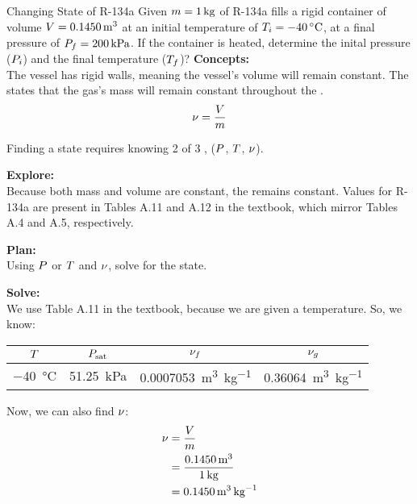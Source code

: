 \begin{example}[Problem 4.112]{Changing State of R-134a}
  Given $m = \SI{1}{\kilo\gram}$ of R-134a fills a rigid container of volume $V = \SI{0.1450}{\meter\cubed}$ at an initial temperature of $\Temp_{i} = \SI{-40}{\degreeCelsius}$, at a final pressure of $P_{f} = \SI{200}{\kilo\pascal}$.
  If the container is heated, determine the inital pressure ($P_{i}$) and the final temperature ($T_{f}$)?
  \tcblower{}
  \textbf{Concepts:} \\
  The vessel has rigid walls, meaning the vessel's volume will remain constant.
  The  states that the gas's mass will remain constant throughout the . \\
  \begin{equation*}
    \nu = \frac{V}{m}
  \end{equation*}

  Finding a state requires knowing 2 of 3 , ($P$, $T$, $\nu$).

  \textbf{Explore:} \\
  Because both mass and volume are constant, the  remains constant.
  Values for R-134a are present in Tables A.11 and A.12 in the textbook, which mirror Tables A.4 and A.5, respectively.

  \textbf{Plan:} \\
  Using $P$ or $T$ and $\nu$, solve for the state.

  \textbf{Solve:} \\
  We use Table A.11 in the textbook, because we are given a temperature.
  So, we know:
  \begin{center}
    \begin{tabular}{cccc}
      \toprule
      $T$ & $P_{\mathrm{sat}}$ & $\nu_{f}$ & $\nu_{g}$ \\
      \midrule
      \SI{-40}{\degreeCelsius} & \SI{51.25}{\kilo\pascal} & \SI{0.0007053}{\meter\cubed\per\kilo\gram} & \SI{0.36064}{\meter\cubed\per\kilo\gram} \\
      \bottomrule
    \end{tabular}
  \end{center}

  Now, we can also find $\nu$:
  \begin{align*}
    \nu &= \frac{V}{m} \\
                    &= \frac{\SI{0.1450}{\meter\cubed}}{\SI{1}{\kilo\gram}} \\
                    &= \SI{0.1450}{\meter\cubed\per\kilo\gram}
  \end{align*}


\end{example}
